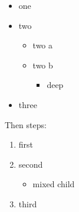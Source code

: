 \begin{itemize}
  \item one
  \item two
  \begin{itemize}
    \item two a
    \item two b
    \begin{itemize}
      \item deep
    \end{itemize}
  \end{itemize}
  \item three
\end{itemize}

Then steps:

\begin{enumerate}
  \item first
  \item second
  \begin{itemize}
    \item mixed child
  \end{itemize}
  \item third
\end{enumerate}
